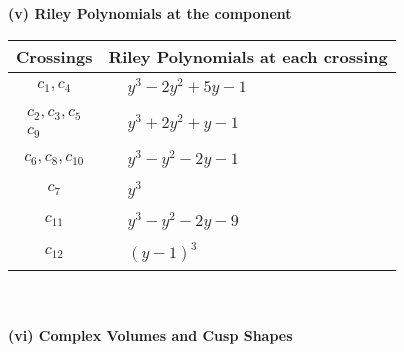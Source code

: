 \documentclass[1p]{elsarticle_modified}
\theoremstyle{definition}
\begin{document}
\newpage\renewcommand{\arraystretch}{1}
\flushleft \textbf{(v) Riley Polynomials at the component}\newline \\
\begin{tabular}{m{50pt}|m{274pt}}
Crossings & \hspace{64pt}Riley Polynomials at each crossing \\
\hline $$\begin{aligned}c_{1},c_{4}\end{aligned}$$&$\begin{aligned}
&y^3-2 y^2+5 y-1
\end{aligned}$\\
\hline $$\begin{aligned}c_{2},c_{3},c_{5}\\c_{9}\end{aligned}$$&$\begin{aligned}
&y^3+2 y^2+y-1
\end{aligned}$\\
\hline $$\begin{aligned}c_{6},c_{8},c_{10}\end{aligned}$$&$\begin{aligned}
&y^3- y^2-2 y-1
\end{aligned}$\\
\hline $$\begin{aligned}c_{7}\end{aligned}$$&$\begin{aligned}
&y^3
\end{aligned}$\\
\hline $$\begin{aligned}c_{11}\end{aligned}$$&$\begin{aligned}
&y^3- y^2-2 y-9
\end{aligned}$\\
\hline $$\begin{aligned}c_{12}\end{aligned}$$&$\begin{aligned}
&(y-1)^3
\end{aligned}$\\
\hline
\end{tabular}\\~\\
\newpage\flushleft \textbf{(vi) Complex Volumes and Cusp Shapes}
\end{document}
